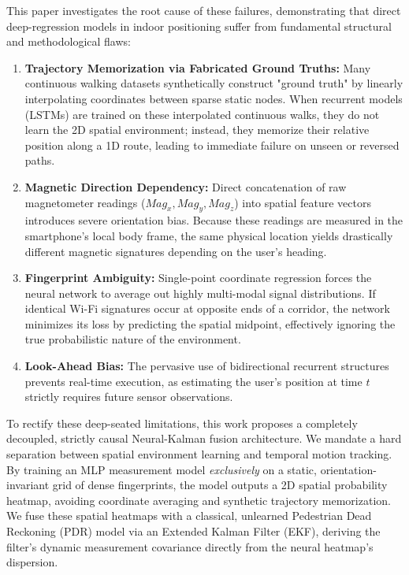 \documentclass[journal,twoside,compsoc]{IEEEtran}
\begin{document}
This paper investigates the root cause of these failures, demonstrating that direct deep-regression models in indoor positioning suffer from fundamental structural and methodological flaws:
\begin{enumerate}
    \item \textbf{Trajectory Memorization via Fabricated Ground Truths:} Many continuous walking datasets synthetically construct "ground truth" by linearly interpolating coordinates between sparse static nodes. When recurrent models (LSTMs) are trained on these interpolated continuous walks, they do not learn the 2D spatial environment; instead, they memorize their relative position along a 1D route, leading to immediate failure on unseen or reversed paths.
    \item \textbf{Magnetic Direction Dependency:} Direct concatenation of raw magnetometer readings ($Mag_x, Mag_y, Mag_z$) into spatial feature vectors introduces severe orientation bias. Because these readings are measured in the smartphone's local body frame, the same physical location yields drastically different magnetic signatures depending on the user's heading.
    \item \textbf{Fingerprint Ambiguity:} Single-point coordinate regression forces the neural network to average out highly multi-modal signal distributions. If identical Wi-Fi signatures occur at opposite ends of a corridor, the network minimizes its loss by predicting the spatial midpoint, effectively ignoring the true probabilistic nature of the environment.
    \item \textbf{Look-Ahead Bias:} The pervasive use of bidirectional recurrent structures prevents real-time execution, as estimating the user's position at time $t$ strictly requires future sensor observations.
\end{enumerate}

To rectify these deep-seated limitations, this work proposes a completely decoupled, strictly causal Neural-Kalman fusion architecture. We mandate a hard separation between spatial environment learning and temporal motion tracking. By training an MLP measurement model \textit{exclusively} on a static, orientation-invariant grid of dense fingerprints, the model outputs a 2D spatial probability heatmap, avoiding coordinate averaging and synthetic trajectory memorization. We fuse these spatial heatmaps with a classical, unlearned Pedestrian Dead Reckoning (PDR) model via an Extended Kalman Filter (EKF), deriving the filter's dynamic measurement covariance directly from the neural heatmap's dispersion.
\end{document}
